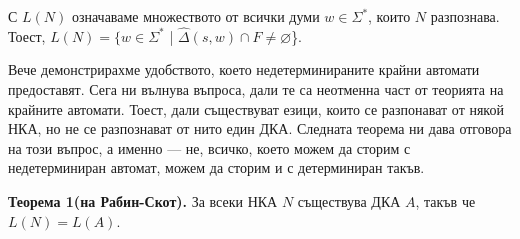 \documentclass[openany]{book}
\begin{document}
        С $L(N)$ означаваме множеството от всички думи $w \in \Sigma^*$, които $N$ разпознава.
        Тоест, $L(N) = \{w \in \Sigma^*$ | $\hat{\Delta}(s,w) \cap F \neq \varnothing$\}.
    
        \vspace{15pt}
    
        Вече демонстрирахме удобството, което недетерминираните крайни автомати предоставят.
        Сега ни вълнува въпроса, дали те са неотменна част от теорията на крайните автомати.
        Тоест, дали съществуват езици, които се разпонават от някой НКА, но не се разпознават
        от нито един ДКА. Следната теорема ни дава отговора на този въпрос, а именно — не,
        всичко, което можем да сторим с недетерминиран автомат, можем да сторим и с детерминиран
        такъв.
    
        \vspace{15pt}
    
        \textbf{Теорема 1(на Рабин-Скот).} За всеки НКА $N$ съществува ДКА $A$, такъв че
        $L(N) = L(A)$.
    
        \vspace{15pt}
    
\end{document}
